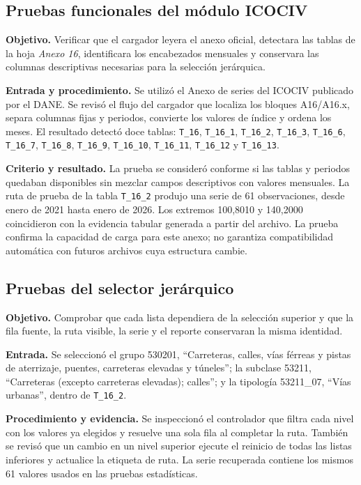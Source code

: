 \documentclass[12pt,letterpaper]{article}
\newcommand{\ICOCIV}{ICOCIV}
\newcommand{\DANE}{DANE}
\begin{document}
\subsection{Pruebas funcionales del módulo ICOCIV}

\textbf{Objetivo.} Verificar que el cargador leyera el anexo oficial, detectara las tablas de la hoja \textit{Anexo 16}, identificara los encabezados mensuales y conservara las columnas descriptivas necesarias para la selección jerárquica.

\textbf{Entrada y procedimiento.} Se utilizó el Anexo de series del \ICOCIV{} publicado por el \DANE. Se revisó el flujo del cargador que localiza los bloques A16/A16.x, separa columnas fijas y periodos, convierte los valores de índice y ordena los meses. El resultado detectó doce tablas: \texttt{T\_16}, \texttt{T\_16\_1}, \texttt{T\_16\_2}, \texttt{T\_16\_3}, \texttt{T\_16\_6}, \texttt{T\_16\_7}, \texttt{T\_16\_8}, \texttt{T\_16\_9}, \texttt{T\_16\_10}, \texttt{T\_16\_11}, \texttt{T\_16\_12} y \texttt{T\_16\_13}.

\textbf{Criterio y resultado.} La prueba se consideró conforme si las tablas y periodos quedaban disponibles sin mezclar campos descriptivos con valores mensuales. La ruta de prueba de la tabla \texttt{T\_16\_2} produjo una serie de 61 observaciones, desde enero de 2021 hasta enero de 2026. Los extremos 100,8010 y 140,2000 coincidieron con la evidencia tabular generada a partir del archivo. La prueba confirma la capacidad de carga para este anexo; no garantiza compatibilidad automática con futuros archivos cuya estructura cambie.

\subsection{Pruebas del selector jerárquico}

\textbf{Objetivo.} Comprobar que cada lista dependiera de la selección superior y que la fila fuente, la ruta visible, la serie y el reporte conservaran la misma identidad.

\textbf{Entrada.} Se seleccionó el grupo 530201, ``Carreteras, calles, vías férreas y pistas de aterrizaje, puentes, carreteras elevadas y túneles''; la subclase 53211, ``Carreteras (excepto carreteras elevadas); calles''; y la tipología 53211\_07, ``Vías urbanas'', dentro de \texttt{T\_16\_2}.

\textbf{Procedimiento y evidencia.} Se inspeccionó el controlador que filtra cada nivel con los valores ya elegidos y resuelve una sola fila al completar la ruta. También se revisó que un cambio en un nivel superior ejecute el reinicio de todas las listas inferiores y actualice la etiqueta de ruta. La serie recuperada contiene los mismos 61 valores usados en las pruebas estadísticas.
\end{document}
